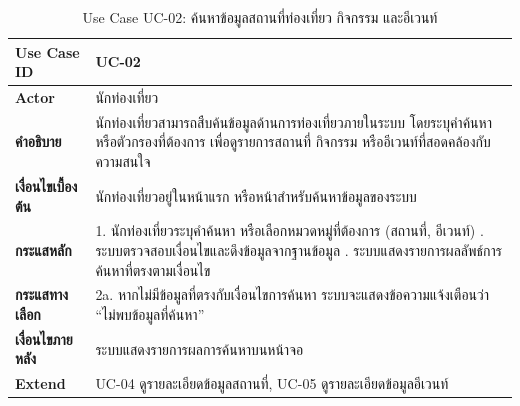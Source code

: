 \begin{table}[H]
\centering
\caption{Use Case UC-02: ค้นหาข้อมูลสถานที่ท่องเที่ยว กิจกรรม และอีเวนท์}
\label{tab:uc02}
\begin{tabular}{|p{3.2cm}|p{10cm}|}
\hline
\textbf{Use Case ID} & UC-02 \\ \hline
\textbf{Actor} & นักท่องเที่ยว \\ \hline
\textbf{คำอธิบาย} & นักท่องเที่ยวสามารถสืบค้นข้อมูลด้านการท่องเที่ยวภายในระบบ โดยระบุคำค้นหาหรือตัวกรองที่ต้องการ เพื่อดูรายการสถานที่ กิจกรรม หรืออีเวนท์ที่สอดคล้องกับความสนใจ \\ \hline
\textbf{เงื่อนไขเบื้องต้น} & นักท่องเที่ยวอยู่ในหน้าแรก หรือหน้าสำหรับค้นหาข้อมูลของระบบ \\ \hline
\textbf{กระแสหลัก} & 1. นักท่องเที่ยวระบุคำค้นหา หรือเลือกหมวดหมู่ที่ต้องการ (สถานที่, อีเวนท์) \newline 2. ระบบตรวจสอบเงื่อนไขและดึงข้อมูลจากฐานข้อมูล \newline 3. ระบบแสดงรายการผลลัพธ์การค้นหาที่ตรงตามเงื่อนไข \\ \hline
\textbf{กระแสทางเลือก} & 2a. หากไม่มีข้อมูลที่ตรงกับเงื่อนไขการค้นหา ระบบจะแสดงข้อความแจ้งเตือนว่า ``ไม่พบข้อมูลที่ค้นหา'' \\ \hline
\textbf{เงื่อนไขภายหลัง} & ระบบแสดงรายการผลการค้นหาบนหน้าจอ \\ \hline
\textbf{Extend} & UC-04 ดูรายละเอียดข้อมูลสถานที่, UC-05 ดูรายละเอียดข้อมูลอีเวนท์ \\
\hline
\end{tabular}
\end{table}

